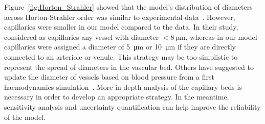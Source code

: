 \documentclass[11pt,]{article}
\begin{document}
Figure~\ref{fig:Horton_Strahler} showed that the model's distribution of diameters across Horton-Strahler order was similar to experimental data~\cite{An2020}.
However, capillaries were smaller in our model compared to the data.
In their study,~\cite{An2020} considered as capillaries any vessel with diameter $<\SI{8}{\micro\metre}$, whereas in our model capillaries were assigned a diameter of \SI{5}{\micro\metre} or \SI{10}{\micro\metre} if they are directly connected to an arteriole or venule.
This strategy may be too simplistic to represent the spread of diameters in the vascular bed.
Others have suggested to update the diameter of vessels based on blood pressure from a first haemodynamics simulation~\cite{Linninger2013}.
More in depth analysis of the capillary beds is necessary in order to develop an appropriate strategy.
In the meantime, sensitivity analysis and uncertainty quantification can help improve the reliability of the model.
\end{document}
